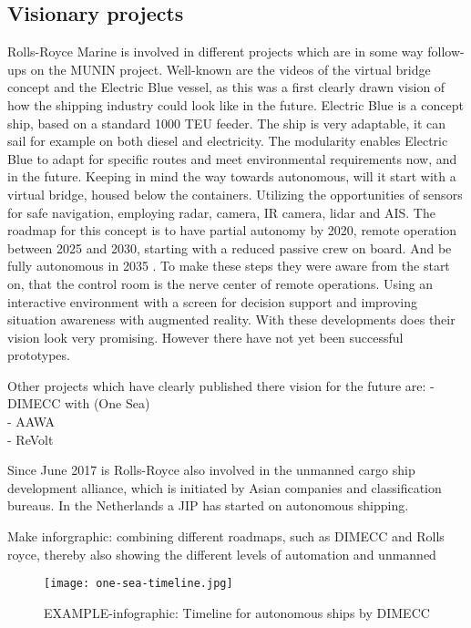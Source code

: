 \subsection{Visionary projects}
Rolls-Royce Marine is involved in different projects which are in some way follow-ups on the MUNIN project. Well-known are the videos of the virtual bridge concept and the Electric Blue vessel, as this was a first clearly drawn vision of how the shipping industry could look like in the future. Electric Blue is a concept ship, based on a standard 1000 \ac{TEU} feeder. The ship is very adaptable, it can sail for example on both diesel and electricity. The modularity enables Electric Blue to adapt for specific routes and meet environmental requirements now, and in the future. 
Keeping in mind the way towards autonomous, will it start with a virtual bridge, housed below the containers. Utilizing the opportunities of sensors for safe navigation, employing radar, camera, IR camera, lidar and \ac{AIS}. The roadmap for this concept is to have partial autonomy by 2020, remote operation between 2025 and 2030, starting with a reduced passive crew on board. And be fully autonomous in 2035 \cite{Wilson2017}. 
To make these steps they were aware from the start on, that the control room is the nerve center of remote operations. Using an interactive environment with a screen for decision support and improving situation awareness with augmented reality. With these developments does their vision look very promising. However there have not yet been successful prototypes.

Other projects which have clearly published there vision for the future are:
- DIMECC with (One Sea)\\
- AAWA\\
- ReVolt\\

Since June 2017 is Rolls-Royce also involved in the unmanned cargo ship development alliance, which is initiated by Asian companies and classification bureaus.
In the Netherlands a \ac{JIP} has started on autonomous shipping.

Make inforgraphic: combining different roadmaps, such as DIMECC and Rolls royce, thereby also showing the different levels of automation and unmanned

\begin{figure}[b]
	\centering
	\texttt{[image: one-sea-timeline.jpg]}
	\caption{EXAMPLE-infographic: Timeline for autonomous ships by DIMECC}
	\label{fig:time-line-autonomous}
\end{figure}

